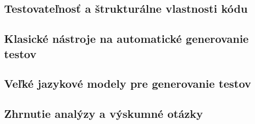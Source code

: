 \subsection{Testovateľnosť a štrukturálne vlastnosti kódu}\label{sec:testovatelnost}

\subsection{Klasické nástroje na automatické generovanie testov}\label{sec:klasicke}

\subsection{Veľké jazykové modely pre generovanie testov}\label{sec:llm}

\subsection{Zhrnutie analýzy a výskumné otázky}\label{sec:rq}

